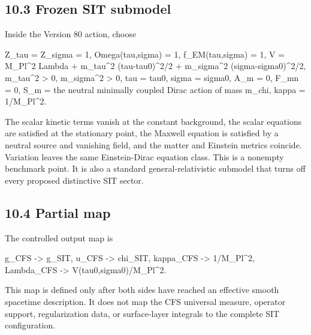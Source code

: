 \documentclass[
  american,
  11pt,
  letterpaper,
]{article}
\newenvironment{Shaded}{}{}
\newcommand{\NormalTok}[1]{#1}
\newcounter{none} %
\begin{document}
\subsection{10.3 Frozen SIT submodel}\label{frozen-sit-submodel}

Inside the Version 80 action, choose

\begin{Shaded}
\begin{Highlighting}[]
\NormalTok{Z\_tau = Z\_sigma = 1,}
\NormalTok{Omega(tau,sigma) = 1,}
\NormalTok{f\_EM(tau,sigma) = 1,}
\NormalTok{V = M\_Pl\^{}2 Lambda}
\NormalTok{    + m\_tau\^{}2 (tau{-}tau0)\^{}2/2}
\NormalTok{    + m\_sigma\^{}2 (sigma{-}sigma0)\^{}2/2,}
\NormalTok{m\_tau\^{}2 \textgreater{} 0,  m\_sigma\^{}2 \textgreater{} 0,}
\NormalTok{tau = tau0,  sigma = sigma0,}
\NormalTok{A\_m = 0,  F\_mn = 0,}
\NormalTok{S\_m = the neutral minimally coupled Dirac action of mass m\_chi,}
\NormalTok{kappa = 1/M\_Pl\^{}2.}
\end{Highlighting}
\end{Shaded}

The scalar kinetic terms vanish at the constant background, the scalar equations are satisfied at the stationary point, the Maxwell equation is satisfied by a neutral source and vanishing field, and the matter and Einstein metrics coincide. Variation leaves the same Einstein-Dirac equation class. This is a nonempty benchmark point. It is also a standard general-relativistic submodel that turns off every proposed distinctive SIT sector.

\subsection{10.4 Partial map}\label{partial-map}

The controlled output map is

\begin{Shaded}
\begin{Highlighting}[]
\NormalTok{g\_CFS       {-}\textgreater{} g\_SIT,}
\NormalTok{u\_CFS       {-}\textgreater{} chi\_SIT,}
\NormalTok{kappa\_CFS   {-}\textgreater{} 1/M\_Pl\^{}2,}
\NormalTok{Lambda\_CFS  {-}\textgreater{} V(tau0,sigma0)/M\_Pl\^{}2.}
\end{Highlighting}
\end{Shaded}

This map is defined only after both sides have reached an effective smooth spacetime description. It does not map the CFS universal measure, operator support, regularization data, or surface-layer integrals to the complete SIT configuration.
\end{document}
